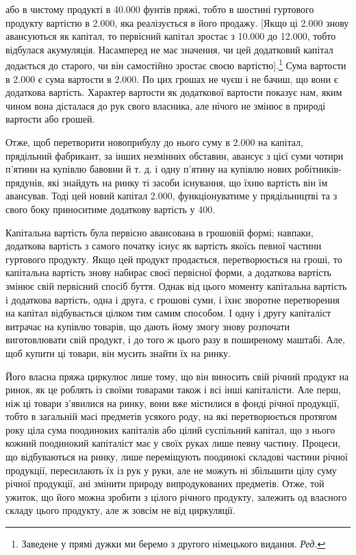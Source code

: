 \parcont{}  %
або в чистому продукті в \num{40.000} фунтів пряжі, тобто в шостині
гуртового продукту вартістю в \num{2.000}, яка
реалізується в його продажу. [Якщо ці \num{2.000}
знову авансуються як капітал, то первісний капітал зростає
з \num{10.000} до \num{12.000}, тобто
відбулася акумуляція. Насамперед не має значення, чи цей додатковий
капітал додається до старого, чи він самостійно зростає
своєю вартістю].\footnote*{
Заведене у прямі дужки ми беремо з другого німецького видання.
\emph{Ред.}
} Сума вартости в \num{2.000} є сума
вартости в \num{2.000}. По цих грошах не чуєш і не
бачиш, що вони є додаткова вартість. Характер вартости як додаткової
вартости показує нам, яким чином вона дісталася до
рук свого власника, але нічого не змінює в природі вартости
або грошей.

Отже, щоб перетворити новоприбулу до нього суму в \num{2.000} на капітал, прядільний фабрикант, за інших незмінних
обставин, авансує з цієї суми чотири п’ятини на купівлю
бавовни й т. д. і одну п’ятину на купівлю нових робітників-прядунів,
які знайдуть на ринку ті засоби існування, що їхню вартість
він їм авансував. Тоді цей новий капітал \num{2.000}, функціонуватиме у прядільництві та з свого боку
приноситиме додаткову вартість у 400.

Капітальна вартість була первісно авансована в грошовій
формі; навпаки, додаткова вартість з самого початку існує як
вартість якоїсь певної частини гуртового продукту. Якщо цей
продукт продається, перетворюється на гроші, то капітальна
вартість знову набирає своєї первісної форми, а додаткова вартість
змінює свій первісний спосіб буття. Однак від цього моменту
капітальна вартість і додаткова вартість, одна і друга, є грошові
суми, і їхнє зворотне перетворення на капітал відбувається цілком
тим самим способом. І одну і другу капіталіст витрачає на
купівлю товарів, що дають йому змогу знову розпочати виготовлювати
свій продукт, і до того ж цього разу в поширеному
маштабі. Але, щоб купити ці товари, він мусить знайти їх на ринку.

Його власна пряжа циркулює лише тому, що він виносить
свій річний продукт на ринок, як це роблять із своїми товарами
також і всі інші капіталісти. Але перш, ніж ці товари з’явилися
на ринку, вони вже містилися в фонді річної продукції, тобто в
загальній масі предметів усякого роду, на які перетворюється
протягом року ціла сума поодиноких капіталів або цілий суспільний
капітал, що з нього кожний поодинокий капіталіст має
у своїх руках лише певну частину. Процеси, що відбуваються на
ринку, лише переміщують поодинокі складові частини річної
продукції, пересилають їх із рук у руки, але не можуть ні збільшити
цілу суму річної продукції, ані змінити природу випродукованих
предметів. Отже, той ужиток, що його можна зробити
з цілого річного продукту, залежить од власного складу цього
продукту, але ж зовсім не від циркуляції.
